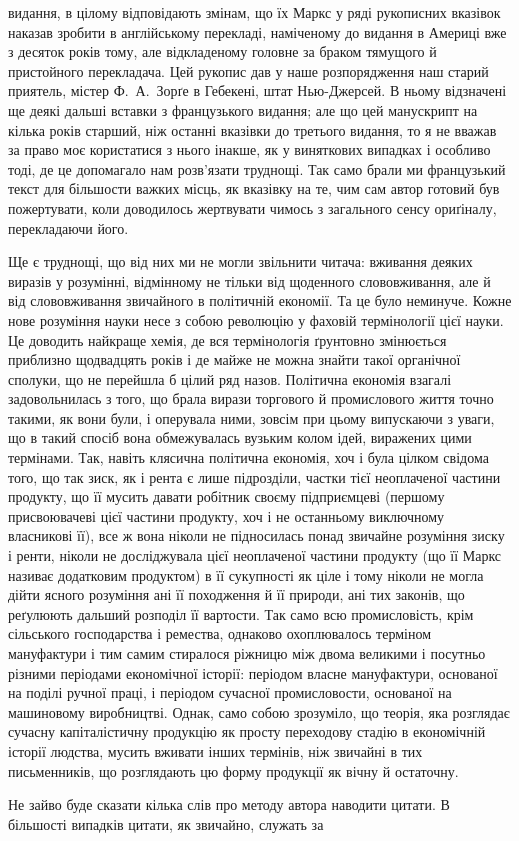 \parcont{}  %
видання, в цілому відповідають змінам, що їх Маркс у ряді рукописних
вказівок наказав зробити в англійському перекладі, наміченому
до видання в Америці вже з десяток років тому, але відкладеному
головне за браком тямущого й пристойного перекладача.
Цей рукопис дав у наше розпорядження наш старий приятель,
містер Ф.~А.~Зорґе в Гебекені, штат Нью-Джерсей. В ньому
відзначені ще деякі дальші вставки з французького видання;
але що цей манускрипт на кілька років старший, ніж останні вказівки
до третього видання, то я не вважав за право моє користатися
з нього інакше, як у виняткових випадках і особливо тоді,
де це допомагало нам розв’язати труднощі. Так само брали ми
французький текст для більшости важких місць, як вказівку на те,
чим сам автор готовий був пожертувати, коли доводилось жертвувати
чимось з загального сенсу ориґіналу, перекладаючи його.

Ще є труднощі, що від них ми не могли звільнити читача: вживання
деяких виразів у розумінні, відмінному не тільки від щоденного
слововживання, але й від слововживання звичайного в
політичній економії. Та це було неминуче. Кожне нове розуміння
науки несе з собою революцію у фаховій термінології цієї науки.
Це доводить найкраще хемія, де вся термінологія ґрунтовно змінюється
приблизно щодвадцять років і де майже не можна знайти
такої органічної сполуки, що не перейшла б цілий ряд назов.
Політична економія взагалі задовольнилась з того, що брала
вирази торгового й промислового життя точно такими, як вони
були, і оперувала ними, зовсім при цьому випускаючи з уваги, що
в такий спосіб вона обмежувалась вузьким колом ідей, виражених
цими термінами. Так, навіть клясична політична економія, хоч
і була цілком свідома того, що так зиск, як і рента є лише підрозділи,
частки тієї неоплаченої частини продукту, що її мусить
давати робітник своєму підприємцеві (першому присвоювачеві
цієї частини продукту, хоч і не останньому виключному власникові
її), все ж вона ніколи не підносилась понад звичайне розуміння
зиску і ренти, ніколи не досліджувала цієї неоплаченої
частини продукту (що її Маркс називає додатковим продуктом)
в її сукупності як ціле і тому ніколи не могла дійти ясного розуміння
ані її походження й її природи, ані тих законів, що реґулюють
дальший розподіл її вартости. Так само всю промисловість,
крім сільського господарства і ремества, однаково охоплювалось
терміном мануфактури і тим самим стиралося ріжницю між двома
великими і посутньо різними періодами економічної історії: періодом
власне мануфактури, основаної на поділі ручної праці,
і періодом сучасної промисловости, основаної на машиновому
виробництві. Однак, само собою зрозуміло, що теорія, яка розглядає
сучасну капіталістичну продукцію як просту переходову
стадію в економічній історії людства, мусить вживати інших
термінів, ніж звичайні в тих письменників, що розглядають цю
форму продукції як вічну й остаточну.

Не зайво буде сказати кілька слів про методу автора наводити
цитати. В більшості випадків цитати, як звичайно, служать за
\parbreak{}  %
